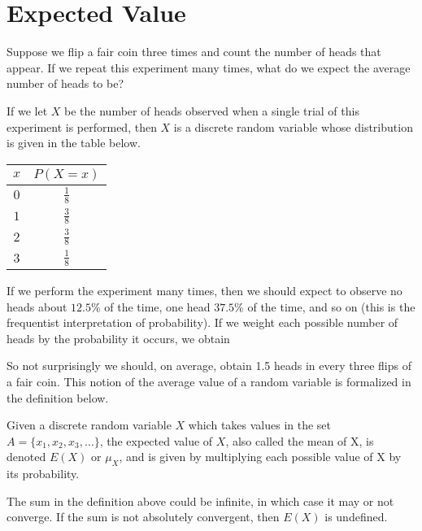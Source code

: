 \section{Expected Value}\label{ExpectedValueSec}
\par
Suppose we flip a fair coin three times and count the number of heads that appear. If we repeat this experiment many times, what do we expect the average number of heads to be?
\par
If we let $X$ be the number of heads observed when a single trial of this experiment is performed, then $X$ is a discrete random variable whose distribution is given in the table below.
\vspace{-0.5em}
\renewcommand*{\arraystretch}{1.35}
\begin{center}
\begin{tabular}{c|c}
$x$ & $P(X = x)$ \\
\hline
$0$ & $\frac{1}{8}$ \\
$1$ & $\frac{3}{8}$ \\
$2$ & $\frac{3}{8}$ \\
$3$ & $\frac{1}{8}$
\end{tabular}
\end{center}
\renewcommand*{\arraystretch}{1}
\par
If we perform the experiment many times, then we should expect to observe no heads about $12.5\%$ of the time, one head $37.5\%$ of the time, and so on (this is the frequentist interpretation of probability). If we weight each possible number of heads by the probability it occurs, we obtain
\par
So not surprisingly we should, on average, obtain 1.5 heads in every three flips of a fair coin. This notion of the average value of a random variable is formalized in the definition below.

\begin{defn}\label{expectedvaluedef}
Given a discrete random variable $X$ which takes values in the set $A = \{x_1, x_2, x_3, \dots\}$, the expected value of $X$, also called the mean of X, is denoted $E(X)$ or $\mu_X$, and is given by multiplying each possible value of X by its probability.
\end{defn}

\rmk The sum in the definition above could be infinite, in which case it may or not converge. If the sum is not absolutely convergent, then $E(X)$ is undefined.

